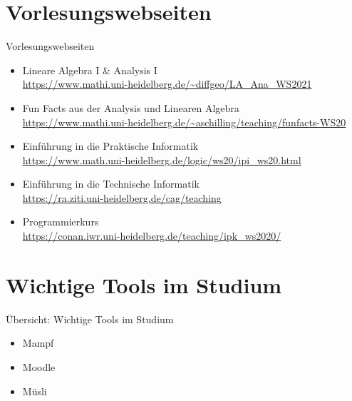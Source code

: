 
\section{Vorlesungswebseiten}
\begin{frame}{Vorlesungswebseiten}
    \begin{itemize}
    	\item Lineare Algebra I \& Analysis I \\
    	\url{https://www.mathi.uni-heidelberg.de/~diffgeo/LA_Ana_WS2021}
    	\item Fun Facts
aus der
Analysis und Linearen Algebra \\
    	\url{https://www.mathi.uni-heidelberg.de/~aschilling/teaching/funfacts-WS20}
    	\item Einführung in die Praktische Informatik\\
    	\url{https://www.math.uni-heidelberg.de/logic/ws20/ipi_ws20.html}
    	\item Einführung in die Technische Informatik \\
    	\url{https://ra.ziti.uni-heidelberg.de/cag/teaching}
    	\item Programmierkurs \\
    	\url{https://conan.iwr.uni-heidelberg.de/teaching/ipk_ws2020/}
    \end{itemize}
\end{frame}


\section{Wichtige Tools im Studium}
\begin{frame}{Übersicht: Wichtige Tools im Studium}
	\Large
    \begin{itemize}
        \item Mampf
        \item Moodle
        \item Müsli
    \end{itemize}
\end{frame}



